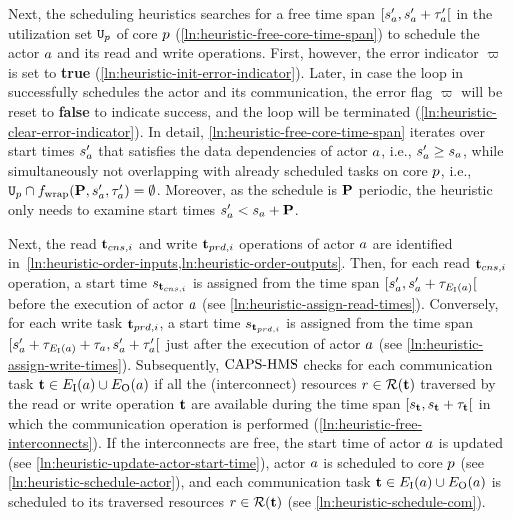 Next, the scheduling heuristics searches for a free time span $[s'_a, s'_a+\tau'_a[$ in the utilization set $\mathtt{U}_p$ of core $p$ (\cref{ln:heuristic-free-core-time-span}) to schedule the actor $a$ and its read and write operations.
First, however, the error indicator $\varpi$ is set to \textbf{true} (\cref{ln:heuristic-init-error-indicator}).
Later, in case the loop in~ successfully schedules the actor and its communication, the error flag $\varpi$ will be reset to \textbf{false} to indicate success, and the loop will be terminated (\cref{ln:heuristic-clear-error-indicator}).
In detail, \cref{ln:heuristic-free-core-time-span} iterates over start times $s'_a$ that satisfies the data dependencies of actor $a$, i.e., $s'_a \geq s_a$, while simultaneously not overlapping with already scheduled tasks on core $p$, i.e., $\mathtt{U}_p \cap f_\mathrm{wrap}(\mathbf{P}, s'_a, \tau'_a) = \emptyset$.
Moreover, as the schedule is $\mathbf{P}$ periodic, the heuristic only needs to examine start times $s'_a < s_a + \mathbf{P}$.
\par
Next, the read $\mathbf{t}_{cns,i}$ and write $\mathbf{t}_{prd,i}$ operations of actor $a$ are identified in~\cref{ln:heuristic-order-inputs,ln:heuristic-order-outputs}.
Then, for each read $\mathbf{t}_{cns,i}$ operation, a start time $s_{\mathbf{t}_{cns,i}}$ is assigned from the time span $[s'_{a}, s'_{a}+\tau_{E_\textrm{I}(a)}[$ before the execution of actor $a$ (see \cref{ln:heuristic-assign-read-times}).
Conversely, for each write task $\mathbf{t}_{prd,i}$, a start time $s_{\mathbf{t}_{prd,i}}$ is assigned from the time span $[s'_{a}+\tau_{E_\textrm{I}(a)}+\tau_a,s'_{a}+\tau'_a[$ just after the execution of actor $a$ (see \cref{ln:heuristic-assign-write-times}).
Subsequently, $\textup{CAPS-HMS}$ checks for each communication task $\mathbf{t} \in E_\textrm{I}(a) \cup E_\textrm{O}(a)$ if all the (interconnect) resources $r \in \mathcal{R}(\mathbf{t})$ traversed by the read or write operation $\mathbf{t}$ are available during the time span $[s_{\mathbf{t}},s_{\mathbf{t}}+\tau_{\mathbf{t}}[$ in which the communication operation is performed (\cref{ln:heuristic-free-interconnects}).
If the interconnects are free, the start time of actor $a$ is updated (see \cref{ln:heuristic-update-actor-start-time}), actor $a$ is scheduled to core $p$ (see \cref{ln:heuristic-schedule-actor}), and each communication task $\mathbf{t} \in E_\textrm{I}(a) \cup E_\textrm{O}(a)$ is scheduled to its traversed resources $r \in \mathcal{R}(\mathbf{t})$ (see \cref{ln:heuristic-schedule-com}).
